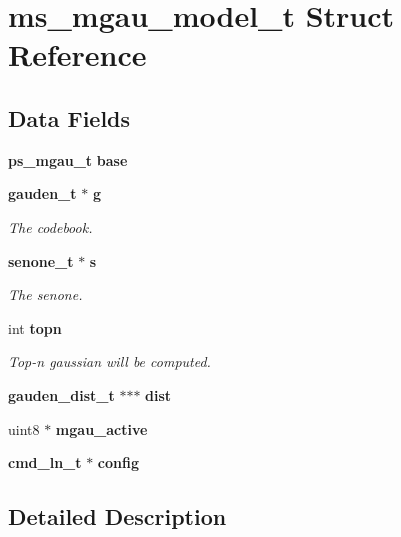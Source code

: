 \section{ms\-\_\-mgau\-\_\-model\-\_\-t Struct Reference}
\label{structms__mgau__model__t}
\subsection*{Data Fields}
\begin{DoxyCompactItemize}
\item 
{\bf ps\-\_\-mgau\-\_\-t} {\bfseries base}\label{structms__mgau__model__t_a7cf0c4a3c033912a8ab28eb5924fb892}

\item 
{\bf gauden\-\_\-t} $\ast$ {\bf g}\label{structms__mgau__model__t_a91027cdb757280ac557668068e6f1b07}

\begin{DoxyCompactList}\small\item\em The codebook. \end{DoxyCompactList}\item 
{\bf senone\-\_\-t} $\ast$ {\bf s}\label{structms__mgau__model__t_a551527ce9cd5702d854a1a5600122985}

\begin{DoxyCompactList}\small\item\em The senone. \end{DoxyCompactList}\item 
int {\bf topn}
\begin{DoxyCompactList}\small\item\em Top-\/n gaussian will be computed. \end{DoxyCompactList}\item 
{\bf gauden\-\_\-dist\-\_\-t} $\ast$$\ast$$\ast$ {\bfseries dist}\label{structms__mgau__model__t_a07276348bcc1352e45ce61201112fbfa}

\item 
uint8 $\ast$ {\bfseries mgau\-\_\-active}\label{structms__mgau__model__t_a1b012fcae279fb82fbb8ec2c11570e89}

\item 
{\bf cmd\-\_\-ln\-\_\-t} $\ast$ {\bfseries config}\label{structms__mgau__model__t_a7ce63c2b0f68a738da9bd3c137c8d0a5}

\end{DoxyCompactItemize}


\subsection{Detailed Description}


